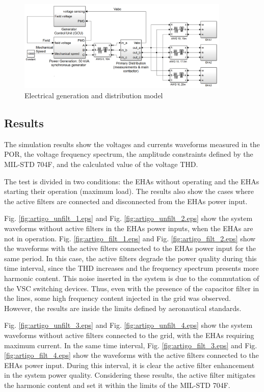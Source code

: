 \begin{figure}[!tb] %
	\centering
	\includegraphics[width=0.9\textwidth]{Figures/simulacao_simulink.png}
	\caption{Electrical generation and distribution model}
	\label{fig:simulacao_simulink.png}
\end{figure}

\subsection{Results}

The simulation results show the voltages and currents waveforms measured in the POR, the voltage frequency spectrum, the amplitude constraints defined by the MIL-STD 704F, and the calculated value of the voltage THD.

The test is divided in two conditions: the EHAs without operating and the EHAs starting their operation (maximum load). The results also show the cases where the active filters are connected and disconnected from the EHAs power input.

Fig. \ref{fig:artigo_unfilt_1.eps} and Fig. \ref{fig:artigo_unfilt_2.eps} show the system waveforms without active filters in the EHAs power inputs, when the EHAs are not in operation. Fig. \ref{fig:artigo_filt_1.eps} and Fig. \ref{fig:artigo_filt_2.eps} show the waveforms with the active filters connected to the EHAs power input for the same period. In this case, the active filters degrade the power quality during this time interval, since the THD increases and the frequency spectrum presents more harmonic content. This noise inserted in the system is due to the commutation of the VSC switching devices. Thus, even with the presence of the capacitor filter in the lines, some high frequency content injected in the grid was observed. However, the results are inside the limits defined by aeronautical standards.

Fig. \ref{fig:artigo_unfilt_3.eps} and Fig. \ref{fig:artigo_unfilt_4.eps} show the system waveforms without active filters connected to the grid, with the EHAs requiring maximum current. In the same time interval, Fig. \ref{fig:artigo_filt_3.eps} and Fig. \ref{fig:artigo_filt_4.eps} show the waveforms with the active filters connected to the EHAs power input. During this interval, it is clear the active filter enhancement in the system power quality. Considering these results, the active filter mitigates the harmonic content and set it within the limits of the MIL-STD 704F.

